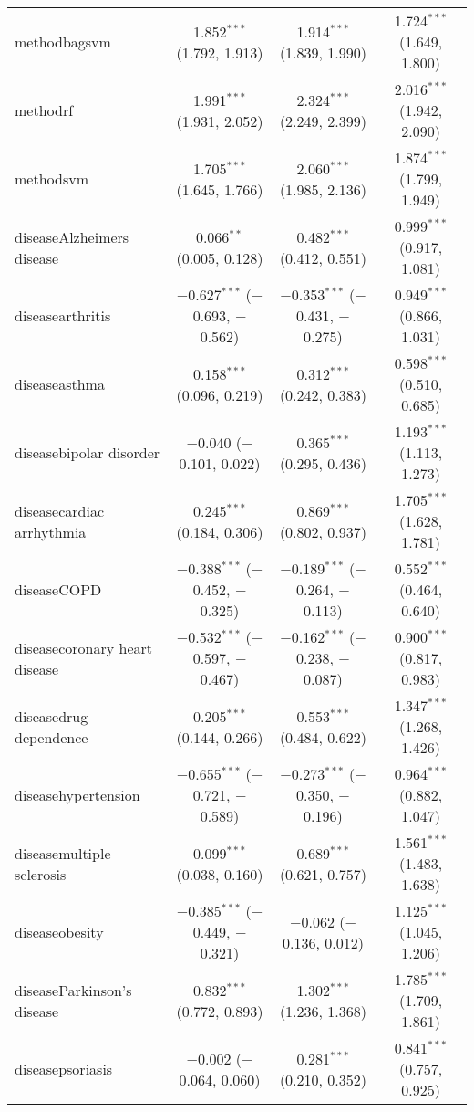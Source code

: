 \begin{table}[!htbp]
\begin{tabular}{@{\extracolsep{5pt}}lccc}
  methodbagsvm & 1.852$^{***}$ (1.792, 1.913) & 1.914$^{***}$ (1.839, 1.990) & 1.724$^{***}$ (1.649, 1.800) \\ 
  methodrf & 1.991$^{***}$ (1.931, 2.052) & 2.324$^{***}$ (2.249, 2.399) & 2.016$^{***}$ (1.942, 2.090) \\ 
  methodsvm & 1.705$^{***}$ (1.645, 1.766) & 2.060$^{***}$ (1.985, 2.136) & 1.874$^{***}$ (1.799, 1.949) \\ 
  diseaseAlzheimers disease & 0.066$^{**}$ (0.005, 0.128) & 0.482$^{***}$ (0.412, 0.551) & 0.999$^{***}$ (0.917, 1.081) \\ 
  diseasearthritis & $-$0.627$^{***}$ ($-$0.693, $-$0.562) & $-$0.353$^{***}$ ($-$0.431, $-$0.275) & 0.949$^{***}$ (0.866, 1.031) \\ 
  diseaseasthma & 0.158$^{***}$ (0.096, 0.219) & 0.312$^{***}$ (0.242, 0.383) & 0.598$^{***}$ (0.510, 0.685) \\ 
  diseasebipolar disorder & $-$0.040 ($-$0.101, 0.022) & 0.365$^{***}$ (0.295, 0.436) & 1.193$^{***}$ (1.113, 1.273) \\ 
  diseasecardiac arrhythmia & 0.245$^{***}$ (0.184, 0.306) & 0.869$^{***}$ (0.802, 0.937) & 1.705$^{***}$ (1.628, 1.781) \\ 
  diseaseCOPD & $-$0.388$^{***}$ ($-$0.452, $-$0.325) & $-$0.189$^{***}$ ($-$0.264, $-$0.113) & 0.552$^{***}$ (0.464, 0.640) \\ 
  diseasecoronary heart disease & $-$0.532$^{***}$ ($-$0.597, $-$0.467) & $-$0.162$^{***}$ ($-$0.238, $-$0.087) & 0.900$^{***}$ (0.817, 0.983) \\ 
  diseasedrug dependence & 0.205$^{***}$ (0.144, 0.266) & 0.553$^{***}$ (0.484, 0.622) & 1.347$^{***}$ (1.268, 1.426) \\ 
  diseasehypertension & $-$0.655$^{***}$ ($-$0.721, $-$0.589) & $-$0.273$^{***}$ ($-$0.350, $-$0.196) & 0.964$^{***}$ (0.882, 1.047) \\ 
  diseasemultiple sclerosis & 0.099$^{***}$ (0.038, 0.160) & 0.689$^{***}$ (0.621, 0.757) & 1.561$^{***}$ (1.483, 1.638) \\ 
  diseaseobesity & $-$0.385$^{***}$ ($-$0.449, $-$0.321) & $-$0.062 ($-$0.136, 0.012) & 1.125$^{***}$ (1.045, 1.206) \\ 
  diseaseParkinson's disease & 0.832$^{***}$ (0.772, 0.893) & 1.302$^{***}$ (1.236, 1.368) & 1.785$^{***}$ (1.709, 1.861) \\ 
  diseasepsoriasis & $-$0.002 ($-$0.064, 0.060) & 0.281$^{***}$ (0.210, 0.352) & 0.841$^{***}$ (0.757, 0.925) \\ 

\end{tabular}
\end{table}
